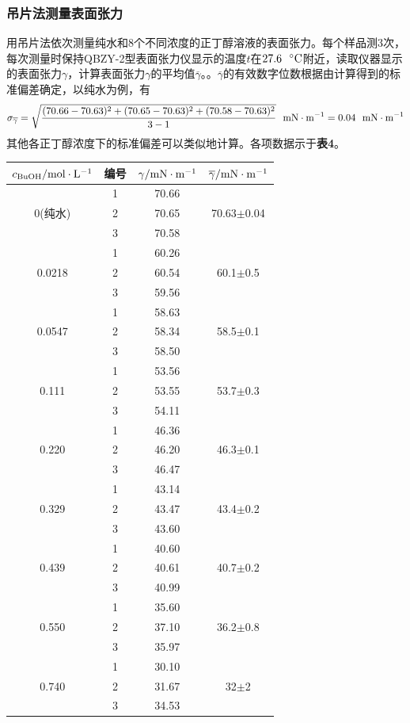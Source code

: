 \documentclass[12pt]{article}
\begin{document}
 \subsubsection{吊片法测量表面张力}
 用吊片法依次测量纯水和8个不同浓度的正丁醇溶液的表面张力。每个样品测3次，每次测量时保持QBZY-2型表面张力仪显示的温度$t$在$27.6\ \ {\rm ^{\circ}C}$附近，读取仪器显示的表面张力$\gamma$，计算表面张力$\gamma$的平均值$\overline{\gamma}$。。$\overline{\gamma}$的有效数字位数根据由计算得到的标准偏差确定，以纯水为例，有
 $$
 \sigma_{\overline{\gamma}}=\sqrt{\frac{(70.66-70.63)^{2}+(70.65-70.63)^{2}+(70.58-70.63)^{2}}{3-1}}\ \ {\rm mN\cdot m^{-1}}=0.04\ \ {\rm mN\cdot m^{-1}}
 $$
 其他各正丁醇浓度下的标准偏差可以类似地计算。各项数据示于\textbf{表4}。
 \begin{table}[h]
	\centering
	\begin{tabular}{cccc}
		\toprule
		$c_{\rm BuOH}/{\rm mol\cdot L^{-1}}$ & 编号 & $\gamma /{\rm mN\cdot m^{-1}}$  & $\overline{\gamma}/{\rm mN\cdot m^{-1}}$  \\
		\midrule
~      & 1&70.66 & ~ \\
0(纯水) & 2  & 70.65 & 70.63$\pm$0.04\\
~      & 3  &70.58 &  \\
\midrule
~      & 1  &60.26 & ~ \\
0.0218 & 2  &60.54 & 60.1$\pm$0.5\\
~      & 3  &59.56 &  \\
\midrule
~      & 1  &58.63 & ~ \\
0.0547 & 2  &58.34 & 58.5$\pm$0.1\\
~      & 3  &58.50 &  \\
\midrule
~      & 1  &53.56 & ~ \\
0.111  & 2  &53.55 & 53.7$\pm$0.3\\
~      & 3  &54.11 &  \\
\midrule
~      & 1  &46.36 & ~ \\
0.220  & 2  &46.20 & 46.3$\pm$0.1\\
~      & 3  &46.47 &  \\
\midrule				
~      & 1  &43.14 & ~ \\
0.329  & 2  &43.47 & 43.4$\pm$0.2\\
~      & 3  &43.60 &  \\
\midrule		
~      & 1  &40.60 & ~ \\
0.439  & 2  &40.61 & 40.7$\pm$0.2\\
~      & 3  &40.99 &  \\
\midrule	
~      & 1  &35.60 & ~ \\
0.550  & 2  &37.10 & 36.2$\pm$0.8\\
~      & 3  &35.97 &  \\
\midrule	
~      & 1  &30.10 & ~ \\
0.740  & 2  &31.67 & 32$\pm$2\\
~      & 3  &34.53 &  \\
		\bottomrule
	\end{tabular}
\end{table}
\par 
 
\end{document}
